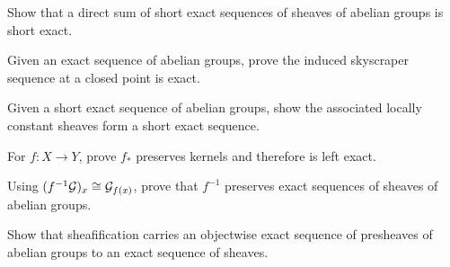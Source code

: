 \begin{exercise}\label{ex:vi16-21}
Show that a direct sum of short exact sequences of sheaves of abelian groups is short exact.
\end{exercise}

\begin{exercise}\label{ex:vi16-22}
Given an exact sequence of abelian groups, prove the induced skyscraper sequence at a closed point is exact.
\end{exercise}

\begin{exercise}\label{ex:vi16-23}
Given a short exact sequence of abelian groups, show the associated locally constant sheaves form a short exact sequence.
\end{exercise}

\begin{exercise}\label{ex:vi16-24}
For $f:X\to Y$, prove $f_*$ preserves kernels and therefore is left exact.
\end{exercise}

\begin{exercise}\label{ex:vi16-25}
Using $(f^{-1}\mathcal G)_x\cong\mathcal G_{f(x)}$, prove that $f^{-1}$ preserves exact sequences of sheaves of abelian groups.
\end{exercise}

\begin{exercise}\label{ex:vi16-26}
Show that sheafification carries an objectwise exact sequence of presheaves of abelian groups to an exact sequence of sheaves.
\end{exercise}

